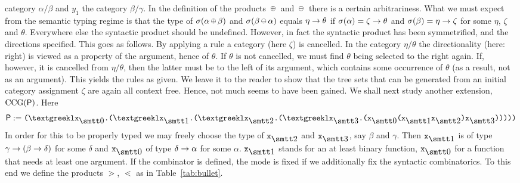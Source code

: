 category $\alpha/\beta$ and $y_1$ the category $\beta/\gamma$. In
the definition of the products $\circplus$ and $\circminus$ there 
is a certain arbitrariness. What we must expect from the semantic 
typing regime is that the type of $\sigma(\alpha \circplus \beta)$ 
and $\sigma(\beta \circminus \alpha)$ 
equals $\eta \rightarrow \theta$ if $\sigma(\alpha) = \zeta \rightarrow \theta$ 
and $\sigma(\beta) = \eta \rightarrow \zeta$ for some $\eta$, $\zeta$ and 
$\theta$.  Everywhere else the syntactic product should be undefined.
However, in fact the syntactic product has been symmetrified, and
the directions specified. This goes as follows. By applying a rule
a category (here $\zeta$) is cancelled. In the category
$\eta/\theta$ the directionality (here: right) is viewed as a
property of the argument, hence of $\theta$. If $\theta$ is not
cancelled, we must find $\theta$ being selected to the right
again. If, however, it is cancelled from $\eta/\theta$, then the
latter must be to the left of its argument, which contains some
occurrence of $\theta$ (as a result, not as an argument). This
yields the rules as given. We leave it to the reader to show that
the tree sets that can be generated from an initial category
assignment $\zeta$ are again all context free. Hence, not much
seems to have been gained. We shall next study another extension,
$\operatorname{CCG}(\mathsf{P})$. Here
\begin{equation}
\mathsf{P} := \mbox{\tt (\stlambda x}_{\snull}\mbox{\tt .(\stlambda
x}_{\seins}\mbox{\tt .(\stlambda x}_{\szwei}\mbox{\tt .(\stlambda %
x}_{\sdrei}\mbox{\tt .(x}_{\snull}\mbox{\tt (x}_{\seins}\mbox{\tt %
x}_{\szwei}\mbox{\tt )x}_{\sdrei}\mbox{\tt )))))} 
\end{equation}
In order for this to be properly typed we may freely choose
the type of $\mbox{\tt x}_{\szwei}$ and $\mbox{\tt x}_{\sdrei}$, 
say $\beta$ and $\gamma$. Then $\mbox{\tt x}_{\seins}$ is of type
$\gamma \rightarrow (\beta \rightarrow \delta)$ for some $\delta$ and
$\mbox{\tt x}_{\snull}$ of type $\delta \rightarrow \alpha$ for some
$\alpha$. $\mbox{\tt x}_{\seins}$ stands for an at least binary function,
$\mbox{\tt x}_{\snull}$ for a function that needs at least one argument.
If the combinator is defined, the mode is fixed if we
additionally fix the syntactic combinatorics. To this end
\index{$\gtrdot$, $\lessdot$}%
we define the products $\gtrdot$, $\lessdot$ as in 
Table~\ref{tab:bullet}.
